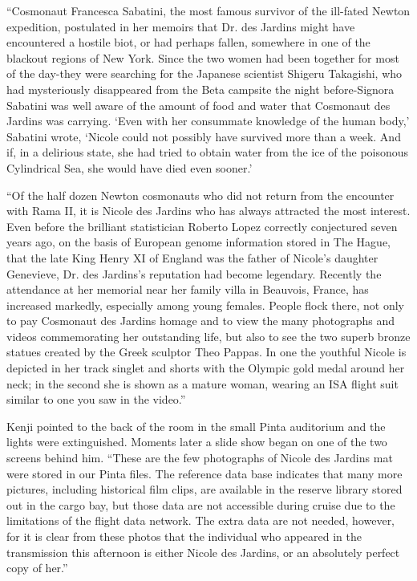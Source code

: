 \documentclass[]{article}
\begin{document}
{“Cosmonaut Francesca Sabatini, the most famous survivor of the ill-fated Newton expedition, postulated in her memoirs that Dr. des Jardins might have encountered a hostile biot, or had perhaps fallen, somewhere in one of the blackout regions of New York. Since the two women had been together for most of the day-they were searching for the Japanese scientist Shigeru Takagishi, who had mysteriously disappeared from the Beta campsite the night before-Signora Sabatini was well aware of the amount of food and water that Cosmonaut des Jardins was carrying. ‘Even with her consummate knowledge of the human body,’ Sabatini wrote, ‘Nicole could not possibly have survived more than a week. And if, in a delirious state, she had tried to obtain water from the ice of the poisonous Cylindrical Sea, she would have died even sooner.’

“Of the half dozen Newton cosmonauts who did not return from the encounter with Rama II, it is Nicole des Jardins who has always attracted the most interest. Even before the brilliant statistician Roberto Lopez correctly conjectured seven years ago, on the basis of European genome information stored in The Hague, that the late King Henry XI of England was the father of Nicole’s daughter Genevieve, Dr. des Jardins’s reputation had become legendary. Recently the attendance at her memorial near her family villa in Beauvois, France, has increased markedly, especially among young females. People flock there, not only to pay Cosmonaut des Jardins homage and to view the many photographs and videos commemorating her outstanding life, but also to see the two superb bronze statues created by the Greek sculptor Theo Pappas. In one the youthful Nicole is depicted in her track singlet and shorts with the Olympic gold medal around her neck; in the second she is shown as a mature woman, wearing an ISA flight suit similar to one you saw in the video.”

Kenji pointed to the back of the room in the small Pinta auditorium and the lights were extinguished. Moments later a slide show began on one of the two screens behind him. “These are the few photographs of Nicole des Jardins mat were stored in our Pinta files. The reference data base indicates that many more pictures, including historical film clips, are available in the reserve library stored out in the cargo bay, but those data are not accessible during cruise due to the limitations of the flight data network. The extra data are not needed, however, for it is clear from these photos that the individual who appeared in the transmission this afternoon is either Nicole des Jardins, or an absolutely perfect copy of her.”

}
\end{document}
